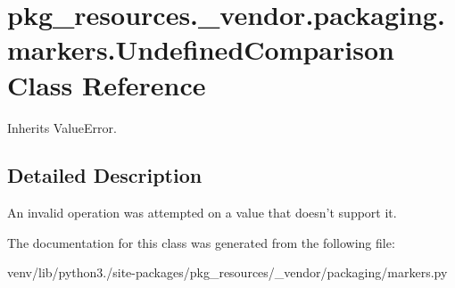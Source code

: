 \hypertarget{classpkg__resources_1_1__vendor_1_1packaging_1_1markers_1_1_undefined_comparison}{}\section{pkg\+\_\+resources.\+\_\+vendor.\+packaging.\+markers.\+Undefined\+Comparison Class Reference}
\label{classpkg__resources_1_1__vendor_1_1packaging_1_1markers_1_1_undefined_comparison}


Inherits Value\+Error.



\subsection{Detailed Description}
\begin{DoxyVerb}An invalid operation was attempted on a value that doesn't support it.
\end{DoxyVerb}
 

The documentation for this class was generated from the following file\+:\begin{DoxyCompactItemize}
\item 
venv/lib/python3./site-\/packages/pkg\+\_\+resources/\+\_\+vendor/packaging/markers.\+py\end{DoxyCompactItemize}
